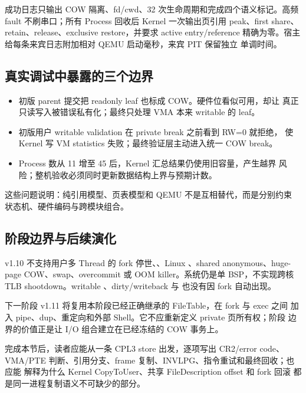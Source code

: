 成功日志只输出 COW 隔离、fd/cwd、32 次生命周期和完成四个语义标记。高频
fault 不刷串口；所有 Process 回收后 Kernel 一次输出页引用 peak、first
share、retain、release、exclusive restore，并要求 active entry/reference
精确为零。宿主给每条来宾日志附加相对 QEMU 启动毫秒，来宾 PIT 保留独立
单调时间。

\subsection{真实调试中暴露的三个边界}

\begin{itemize}
  \item 初版 parent 提交把 readonly leaf 也标成 COW。硬件位看似可用，却让
        真正只读写入被错误私有化；最终只处理 VMA 本来 writable 的 leaf。
  \item 初版用户 writable validation 在 private break 之前看到 RW=0 就拒绝，
        使 Kernel 写 VM statistics 失败；最终验证层主动进入统一 COW break。
  \item Process 数从 11 增至 45 后，Kernel 汇总结果仍使用旧容量，产生越界
        风险；整机验收必须同时更新数据结构上界与预期计数。
\end{itemize}

这些问题说明：纯引用模型、页表模型和 QEMU 不是互相替代，而是分别约束
状态机、硬件编码与跨模块组合。

\subsection{阶段边界与后续演化}

v1.10 不支持用户多 Thread 的 fork 停世、、Linux
、shared anonymous、huge-page COW、swap、overcommit 或 OOM
killer。系统仍是单 BSP，不实现跨核 TLB shootdown。writable
、dirty/writeback 与  也没有因 fork 自动出现。

下一阶段 v1.11 将复用本阶段已经正确继承的 FileTable，在 fork 与 exec 之间
加入 pipe、dup、重定向和外部 Shell。它不应重新定义 private 页所有权；阶段
边界的价值正是让 I/O 组合建立在已经冻结的 COW 事务上。

\begin{contractbox}
完成本节后，读者应能从一条 CPL3 store 出发，逐项写出 CR2/error code、
VMA/PTE 判断、引用分支、frame 复制、INVLPG、指令重试和最终回收；也应能
解释为什么 Kernel CopyToUser、共享 FileDescription offset 和 fork 回滚
都是同一进程复制语义不可缺少的部分。
\end{contractbox}
